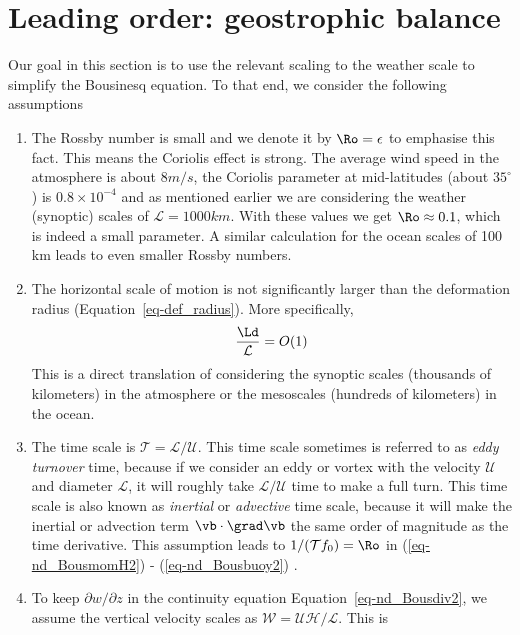 \documentclass[
  letterpaper,
  twocolumn,
  landscape]{report}
\providecommand{\tightlist}{%
  \setlength{\itemsep}{0pt}\setlength{\parskip}{0pt}}\usepackage{longtable,booktabs,array}
\begin{document}
\hypertarget{leading-order-geostrophic-balance}{%
\section{Leading order: geostrophic
balance}\label{leading-order-geostrophic-balance}}

Our goal in this section is to use the relevant scaling to the weather
scale to simplify the Bousinesq equation. To that end, we consider the
following assumptions

\begin{enumerate}
\def\labelenumi{\arabic{enumi}.}
\tightlist
\item
  The Rossby number is small and we denote it by \(\Ro =\epsilon\) to
  emphasise this fact. This means the Coriolis effect is strong. The
  average wind speed in the atmosphere is about \(8 m/s\), the Coriolis
  parameter at mid-latitudes (about \(35^{\circ}\)) is
  \(0.8 \times 10^{-4}\) and as mentioned earlier we are considering the
  weather (synoptic) scales of \(\mathcal{L} = 1000 km\). With these
  values we get \(\Ro \approx 0.1\), which is indeed a small parameter.
  A similar calculation for the ocean scales of 100 km leads to even
  smaller Rossby numbers.
\item
  The horizontal scale of motion is not significantly larger than the
  deformation radius (Equation~\ref{eq-def_radius}). More specifically,
  \[\frac{\Ld}{\mathcal{L}} = O(1) \] This is a direct translation of
  considering the synoptic scales (thousands of kilometers) in the
  atmosphere or the mesoscales (hundreds of kilometers) in the ocean.
\item
  The time scale is \(\mathcal{T}=\mathcal{L}/\mathcal{U}\). This time
  scale sometimes is referred to as \emph{eddy turnover} time, because
  if we consider an eddy or vortex with the velocity \(\mathcal{U}\) and
  diameter \(\mathcal{L}\), it will roughly take
  \(\mathcal{L}/\mathcal{U}\) time to make a full turn. This time scale
  is also known as \emph{inertial} or \emph{advective} time scale,
  because it will make the inertial or advection term
  \(\vb \cdot \grad \vb\) the same order of magnitude as the time
  derivative. This assumption leads to \(1/(\mathcal{T}f_0)=\Ro\) in
  (\ref{eq-nd_BousmomH2}) - (\ref{eq-nd_Bousbuoy2}) .
\item
  To keep \(\partial w / \partial z\) in the continuity equation
  Equation~\ref{eq-nd_Bousdiv2}, we assume the vertical velocity scales
  as \(\mathcal{W} = \mathcal{U} \mathcal{H} / \mathcal{L}\). This is

\end{enumerate}
\end{document}
